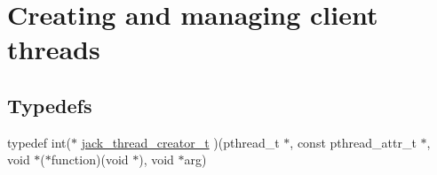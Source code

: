 \hypertarget{group__ClientThreads}{\section{\-Creating and managing client threads}
\label{d3/d54/group__ClientThreads}
}
\subsection*{\-Typedefs}
\begin{DoxyCompactItemize}
\item 
typedef int($\ast$ \hyperlink{group__ClientThreads_ga9f8adda8b9aad771b6b3bb663f798264}{jack\-\_\-thread\-\_\-creator\-\_\-t} )(pthread\-\_\-t $\ast$, const pthread\-\_\-attr\-\_\-t $\ast$, void $\ast$($\ast$function)(void $\ast$), void $\ast$arg)
\end{DoxyCompactItemize}
